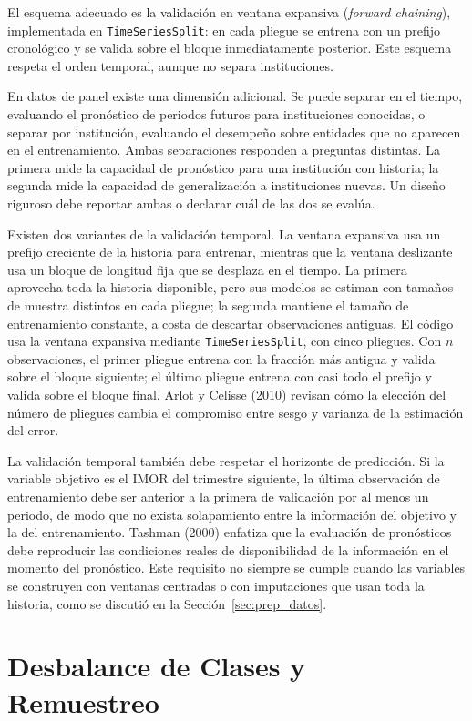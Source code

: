 El esquema adecuado es la validación en ventana expansiva (\textit{forward chaining}), implementada en \texttt{TimeSeriesSplit}: en cada pliegue se entrena con un prefijo cronológico y se valida sobre el bloque inmediatamente posterior. Este esquema respeta el orden temporal, aunque no separa instituciones.

En datos de panel existe una dimensión adicional. Se puede separar en el tiempo, evaluando el pronóstico de periodos futuros para instituciones conocidas, o separar por institución, evaluando el desempeño sobre entidades que no aparecen en el entrenamiento. Ambas separaciones responden a preguntas distintas. La primera mide la capacidad de pronóstico para una institución con historia; la segunda mide la capacidad de generalización a instituciones nuevas. Un diseño riguroso debe reportar ambas o declarar cuál de las dos se evalúa.

Existen dos variantes de la validación temporal. La ventana expansiva usa un prefijo creciente de la historia para entrenar, mientras que la ventana deslizante usa un bloque de longitud fija que se desplaza en el tiempo. La primera aprovecha toda la historia disponible, pero sus modelos se estiman con tamaños de muestra distintos en cada pliegue; la segunda mantiene el tamaño de entrenamiento constante, a costa de descartar observaciones antiguas. El código usa la ventana expansiva mediante \texttt{TimeSeriesSplit}, con cinco pliegues. Con $n$ observaciones, el primer pliegue entrena con la fracción más antigua y valida sobre el bloque siguiente; el último pliegue entrena con casi todo el prefijo y valida sobre el bloque final. Arlot y Celisse (2010) revisan cómo la elección del número de pliegues cambia el compromiso entre sesgo y varianza de la estimación del error.

La validación temporal también debe respetar el horizonte de predicción. Si la variable objetivo es el IMOR del trimestre siguiente, la última observación de entrenamiento debe ser anterior a la primera de validación por al menos un periodo, de modo que no exista solapamiento entre la información del objetivo y la del entrenamiento. Tashman (2000) enfatiza que la evaluación de pronósticos debe reproducir las condiciones reales de disponibilidad de la información en el momento del pronóstico. Este requisito no siempre se cumple cuando las variables se construyen con ventanas centradas o con imputaciones que usan toda la historia, como se discutió en la Sección~\ref{sec:prep_datos}.

\section{Desbalance de Clases y Remuestreo}\label{sec:desbalance}

